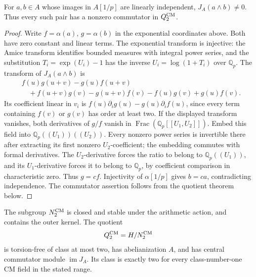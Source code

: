\begin{proposition}\label{prop:cm-decomposable-commutators}
For \(a,b\in A\) whose images in \(A[1/p]\) are linearly
independent, \(J_A(a\wedge b)\ne0\). Thus every such pair
has a nonzero commutator in \(Q_2^{\rm CM}\).
\end{proposition}
\begin{proof}
Write \(f=\alpha(a)\), \(g=\alpha(b)\) in the exponential
coordinates above. Both have zero constant and linear terms.
The exponential transform is injective: the Amice transform
identifies bounded measures with integral power series, and
the substitution \(T_i=\exp(U_i)-1\) has the inverse
\(U_i=\log(1+T_i)\) over \(\mathbb Q_p\).
The transform of \(J_A(a\wedge b)\) is
\begin{align*}
 &f(u)g(u+v)-g(u)f(u+v)\\
 &\quad+f(u+v)g(v)-g(u+v)f(v)-f(u)g(v)+g(u)f(v).
\end{align*}
Its coefficient linear in \(v_i\) is
\(f(u)\partial_i g(u)-g(u)\partial_i f(u)\), since every
term containing \(f(v)\) or \(g(v)\) has order at least two.
If the displayed transform vanishes, both derivatives of
\(g/f\) vanish in \(\operatorname{Frac}(\mathbb Q_p[[U_1,U_2]])\).
Embed this field into \(\mathbb Q_p((U_1))((U_2))\).
Every nonzero power series is invertible there after extracting
its first nonzero \(U_2\)-coefficient; the embedding commutes
with formal derivatives. The \(U_2\)-derivative forces the
ratio to belong to \(\mathbb Q_p((U_1))\), and its
\(U_1\)-derivative forces it to belong to \(\mathbb Q_p\),
by coefficient comparison in characteristic zero. Thus
\(g=cf\). Injectivity of \(\alpha[1/p]\) gives \(b=ca\),
contradicting independence. The commutator assertion follows
from the quotient theorem below.
\end{proof}

\begin{theorem}\label{thm:cm-measure-class-two}
The subgroup \(N_2^{\rm CM}\) is closed and stable under
the arithmetic action, and contains the outer
kernel.  The quotient
\[
                       Q_2^{\rm CM}=H/N_2^{\rm CM}
\]
is torsion-free of class at most two, has abelianization
\(A\), and has central commutator module
\(\operatorname{im}J_A\).
Its class is exactly two for every class-number-one
CM field in the stated range.
\end{theorem}

